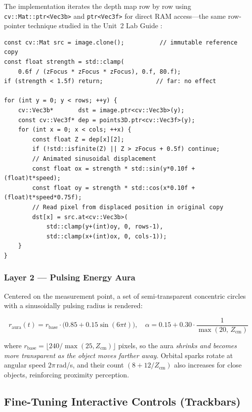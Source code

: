 \documentclass[12pt, a4paper]{article}
\begin{document}
The implementation iterates the depth map row by row using
\texttt{cv::Mat::ptr<Vec3b>} and \texttt{ptr<Vec3f>} for direct RAM access---the
same row-pointer technique studied in the Unit~2 Lab Guide \cite{robles2026guia2}:

\begin{lstlisting}[style=cppstyle, caption={Sinusoidal distortion core (ARRenderer.cpp).}]
const cv::Mat src = image.clone();          // immutable reference copy
const float strength = std::clamp(
    0.6f / (zFocus * zFocus * zFocus), 0.f, 80.f);
if (strength < 1.5f) return;               // far: no effect

for (int y = 0; y < rows; ++y) {
    cv::Vec3b*       dst = image.ptr<cv::Vec3b>(y);
    const cv::Vec3f* dep = points3D.ptr<cv::Vec3f>(y);
    for (int x = 0; x < cols; ++x) {
        const float Z = dep[x][2];
        if (!std::isfinite(Z) || Z > zFocus + 0.5f) continue;
        // Animated sinusoidal displacement
        const float ox = strength * std::sin(y*0.10f + (float)t*speed);
        const float oy = strength * std::cos(x*0.10f + (float)t*speed*0.75f);
        // Read pixel from displaced position in original copy
        dst[x] = src.at<cv::Vec3b>(
            std::clamp(y+(int)oy, 0, rows-1),
            std::clamp(x+(int)ox, 0, cols-1));
    }
}
\end{lstlisting}

\subsubsection*{Layer 2 --- Pulsing Energy Aura}

Centered on the measurement point, a set of semi-transparent concentric circles with
a sinusoidally pulsing radius is rendered:

\begin{equation}
  r_{\text{aura}}(t) = r_{\text{base}} \cdot \bigl(0.85 + 0.15\sin(6\pi t)\bigr),
  \quad
  \alpha = 0.15 + 0.30 \cdot \frac{1}{\max(20,\, Z_{\text{cm}})}
\end{equation}

where $r_{\text{base}} = \lfloor 240 / \max(25, Z_{\text{cm}}) \rfloor$ pixels,
so the aura \emph{shrinks and becomes more transparent as the object moves farther
away}. Orbital sparks rotate at angular speed $2\pi$\,rad/s, and their count
$(8 + 12/Z_{\text{cm}})$ also increases for close objects, reinforcing proximity
perception.

\subsection{Fine-Tuning Interactive Controls (Trackbars)}
\end{document}
